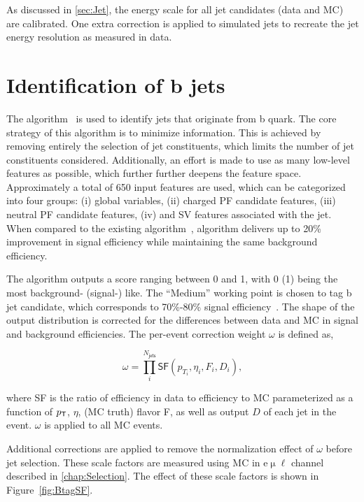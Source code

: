 As discussed in \autoref{sec:Jet}, the energy scale for all jet candidates (data and \ac{MC}) are calibrated. One extra correction is applied to simulated jets to recreate the jet energy resolution as measured in data. 

\section{Identification of b jets}
\label{sec:Btag}

The \DeepJ algorithm~\cite{Bols:2020bkb} is used to identify jets that originate from b quark. The core strategy of this algorithm is to minimize information. This is achieved by removing entirely the selection of jet constituents, which limits the number of jet constituents considered. Additionally, an effort is made to use as many low-level features as possible, which further further deepens the feature space. Approximately a total of 650 input features are used, which can be categorized into four groups: (i) global variables, (ii) charged \ac{PF} candidate features, (iii) neutral \ac{PF} candidate features, (iv) and \ac{SV} features associated with the jet. When compared to the existing \DeepC algorithm~\cite{CMS:2017wtu}, \DeepJ algorithm delivers up to 20\% improvement in signal efficiency while maintaining the same background efficiency.

The \DeepJ algorithm outputs a score ranging between 0 and 1, with 0 (1) being the most background- (signal-) like. The ``Medium'' working point is chosen to tag b jet candidate, which corresponds to 70\%-80\% signal efficiency~\cite{CMS-DP-2018-058}. The shape of the \DeepJ output distribution is corrected for the differences between data and \ac{MC} in signal and background efficiencies. The per-event correction weight $ \omega$ is defined as,
 
 \begin{equation}
 \omega = \prod_{i}^{N_{\textsf{jets}}} \textsf{SF}(p_{T_{i}},\eta_i, F_i, D_i),
 \end{equation}
 
where \textsf{SF} is the ratio of efficiency in data to efficiency to \ac{MC} parameterized as a function of $p_{\textsf{T}}$, $\eta$, (\ac{MC} truth) flavor F, as well as \DeepJ output $D$ of each jet in the event. $\omega$ is applied to all \ac{MC} events.

Additional corrections are applied to remove the normalization effect of $\omega$ before jet selection. These scale factors are measured using \ac{MC} in e$\upmu\ell$ channel described in \autoref{chap:Selection}. The effect of these scale factors is shown in Figure~\ref{fig:BtagSF}.
 
